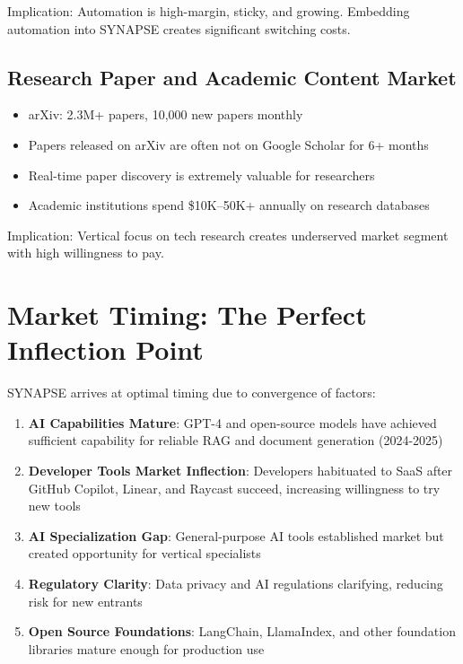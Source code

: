 \documentclass{report}
\begin{document}
Implication: Automation is high-margin, sticky, and growing. Embedding automation into SYNAPSE creates significant switching costs.

\subsection{Research Paper and Academic Content Market}

\begin{itemize}
    \item arXiv: 2.3M+ papers, 10,000 new papers monthly
    \item Papers released on arXiv are often not on Google Scholar for 6+ months
    \item Real-time paper discovery is extremely valuable for researchers
    \item Academic institutions spend \$10K--50K+ annually on research databases
\end{itemize}

Implication: Vertical focus on tech research creates underserved market segment with high willingness to pay.

\section{Market Timing: The Perfect Inflection Point}

SYNAPSE arrives at optimal timing due to convergence of factors:

\begin{enumerate}
    \item \textbf{AI Capabilities Mature}: GPT-4 and open-source models have achieved sufficient capability for reliable RAG and document generation (2024-2025)
    
    \item \textbf{Developer Tools Market Inflection}: Developers habituated to SaaS after GitHub Copilot, Linear, and Raycast succeed, increasing willingness to try new tools
    
    \item \textbf{AI Specialization Gap}: General-purpose AI tools established market but created opportunity for vertical specialists
    
    \item \textbf{Regulatory Clarity}: Data privacy and AI regulations clarifying, reducing risk for new entrants
    
    \item \textbf{Open Source Foundations}: LangChain, LlamaIndex, and other foundation libraries mature enough for production use
\end{enumerate}
\end{document}
